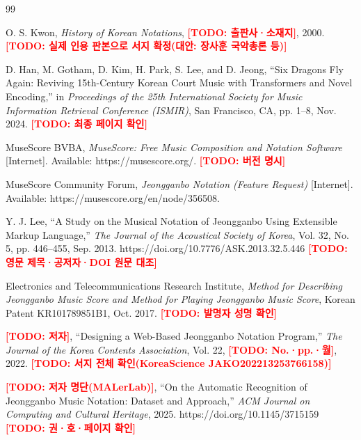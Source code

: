 \documentclass[twocolumn,10pt]{article}
\newcommand{\TODO}[1]{\textcolor{red}{\textbf{[TODO: #1]}}}
\begin{document}
\begin{thebibliography}{99}\small

O. S. Kwon, \textit{History of Korean Notations}, \TODO{출판사·소재지},
2000. \TODO{실제 인용 판본으로 서지 확정(대안: 장사훈 국악총론 등)}

D. Han, M. Gotham, D. Kim, H. Park, S. Lee, and D. Jeong,
``Six Dragons Fly Again: Reviving 15th-Century Korean Court Music with
Transformers and Novel Encoding,'' in \textit{Proceedings of the 25th
International Society for Music Information Retrieval Conference (ISMIR)},
San Francisco, CA, pp. 1--8, Nov. 2024. \TODO{최종 페이지 확인}

MuseScore BVBA, \textit{MuseScore: Free Music Composition and Notation
Software} [Internet]. Available: https://musescore.org/. \TODO{버전 명시}

MuseScore Community Forum, \textit{Jeongganbo Notation (Feature Request)}
[Internet]. Available: https://musescore.org/en/node/356508.

Y. J. Lee, ``A Study on the Musical Notation of Jeongganbo Using Extensible
Markup Language,'' \textit{The Journal of the Acoustical Society of Korea},
Vol. 32, No. 5, pp. 446--455, Sep. 2013.
https://doi.org/10.7776/ASK.2013.32.5.446
\TODO{영문 제목·공저자·DOI 원문 대조}

Electronics and Telecommunications Research Institute, \textit{Method for
Describing Jeongganbo Music Score and Method for Playing Jeongganbo Music
Score}, Korean Patent KR101789851B1, Oct. 2017. \TODO{발명자 성명 확인}

\TODO{저자}, ``Designing a Web-Based Jeongganbo Notation Program,''
\textit{The Journal of the Korea Contents Association}, Vol. 22,
\TODO{No.·pp.·월}, 2022. \TODO{서지 전체 확인(KoreaScience JAKO202213253766158)}

\TODO{저자 명단(MALerLab)}, ``On the Automatic Recognition of Jeongganbo
Music Notation: Dataset and Approach,'' \textit{ACM Journal on Computing and
Cultural Heritage}, 2025. https://doi.org/10.1145/3715159
\TODO{권·호·페이지 확인}


\end{thebibliography}
\end{document}

